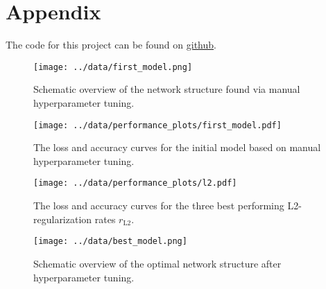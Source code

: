 \section{Appendix}
\label{sec:appendix}
The code for this project can be found on \href{https://github.com/LukasBeiske/project_Flowers-299}{github}.

\begin{figure}
    \centering
    \texttt{[image: ../data/first\_model.png]}
    \caption{Schematic overview of the network structure found via manual hyperparameter tuning.}
    \label{fig:first_model}
\end{figure}

\begin{figure}
    \centering
    \texttt{[image: ../data/performance\_plots/first\_model.pdf]}
    \caption{The loss and accuracy curves for the initial model based on manual hyperparameter tuning.}
    \label{fig:first_curves}
\end{figure}

\begin{figure}
    \centering
    \texttt{[image: ../data/performance\_plots/l2.pdf]}
    \caption{The loss and accuracy curves for the three best performing L2-regularization rates $r_\text{L2}$.}
    \label{fig:l2}
\end{figure}

\begin{figure}
    \centering
    \texttt{[image: ../data/best\_model.png]}
    \caption{Schematic overview of the optimal network structure after hyperparameter tuning.}
    \label{fig:best_model}
\end{figure}